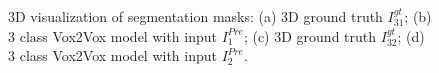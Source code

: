 \begin{figure}[!htb]
\centering
{}\hfil
{}

\hfil 
{}

\caption{3D visualization of segmentation masks: (a) 3D ground truth $I^{gt}_{31}$; (b) 3 class Vox2Vox model with input $I^{Pre}_1$; (c) 3D ground truth $I^{gt}_{32}$; (d) 3 class Vox2Vox model with input $I^{Pre}_2$.}

\label{fig:results-vox2vox-3channel}

\end{figure}

